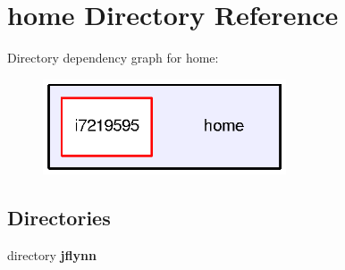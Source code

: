 \section{home Directory Reference}
\label{dir_75b82e7e4a5feb05200b9ad7adf06257}
Directory dependency graph for home\-:
\nopagebreak
\begin{figure}[H]
\begin{center}
\leavevmode
\includegraphics[width=204pt]{dir_75b82e7e4a5feb05200b9ad7adf06257_dep}
\end{center}
\end{figure}
\subsection*{Directories}
\begin{DoxyCompactItemize}
\item 
directory {\bf jflynn}
\end{DoxyCompactItemize}
